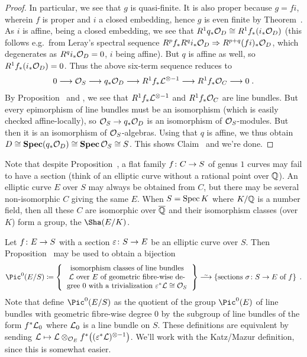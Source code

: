 \documentclass[a4paper,parskip=half,numbers=enddot, DIV=12]{scrreprt}
\begin{document}
\begin{proof}
	In particular, we see that $g$ is quasi-finite. It is also proper because $g=fi$, wherein $f$ is proper and $i$ a closed embedding, hence $g$ is even finite by Theorem~. As $i$ is affine, being a closed embedding, we see that $R^1q_*\mathcal{O}_D\cong R^1f_*(i_*\mathcal{O}_D)$ (this follows e.g.\ from Leray's spectral sequence $R^pf_*R^qi_*\Oo_D\converge R^{p+q}(fi)_*\Oo_D$, which degenerates as $R^qi_*\mathcal{O}_D=0$, $i$ being affine). But $q$ is affine as well, so $R^1f_*(i_*\mathcal{O}_D)=0$. Thus the above six-term sequence reduces to 
	\begin{align}
		0\morphism \Oo_S\morphism q_*\Oo_D\morphism R^1f_*\Ll^{\otimes -1}\morphism R^1f_*\Oo_C\morphism 0\;.
	\end{align}
	By Proposition~ and , we see that $R^1f_*\mathcal{L}^{\otimes -1}$ and $R^1f_*\mathcal{O}_C$ are line bundles. But every epimorphism of line bundles must be an isomorphism (which is easily checked affine-locally), so $\Oo_S\morphism q_*\Oo_D$ is an isomorphism of $\mathcal{O}_S$-modules. But then it is an isomorphism of $\mathcal{O}_S$-algebras. Using that $q$ is affine, we thus obtain $D\cong \operatorname{\mathbf{Spec}} (q_*\mathcal{O}_D)\cong \operatorname{\mathbf{Spec}}\mathcal{O}_S\cong S$. This shows Claim~ and we're done.
\end{proof}
\begin{rem}
	Note that despite Proposition~, a flat family $f\colon C\morphism S$ of genus $1$ curves may fail to have a section (think of an elliptic curve without a rational point over $\mathbb{Q}$). An elliptic curve $E$ over $S$ may always be obtained from $C$, but there may be several non-isomorphic $C$ giving the same $E$. When $S=\operatorname{Spec} K$ where $K/\mathbb{Q}$ is a number field, then all these $C$ are isomorphic over $\overline{\mathbb{Q}}$ and their isomorphism classes (over $K$) form a group, the  $\Sha(E/K)$.
\end{rem}
	Let $f\colon E\morphism S$ with a section $\epsilon\colon S\morphism E$ be an elliptic curve over $S$. Then Proposition~ may be used to obtain a bijection
	\begin{align*}
		\Pic^0(E/S)\coloneqq\left\{\begin{tabular}{c}
			isomorphism classes of line bundles\\
			$\Ll$ over $E$ of geometric fibre-wise de-\\
			gree 0 with a trivialization $\epsilon^*\Ll\cong\Oo_S$
		\end{tabular}\right\}\isomorphism\left\{\text{sections }\sigma\colon S\to E\text{ of }f\right\}\;.
	\end{align*}
	Note that \cite[pp.~63--67]{katzmazur} define $\Pic^0(E/S)$ as the quotient of the group $\Pic^0(E)$ of line bundles with geometric fibre-wise degree $0$ by the subgroup of line bundles of the form $f^*\mathcal{L}_0$ where $\mathcal{L}_0$ is a line bundle on $S$. These definitions are equivalent by sending $\mathcal{L}\mapsto \mathcal{L}\otimes_{\mathcal{O}_E}f^*\big((\varepsilon^*\mathcal{L})^{\otimes -1}\big)$. We'll work with the Katz/Mazur definition, since this is somewhat easier.
	
\end{document}
